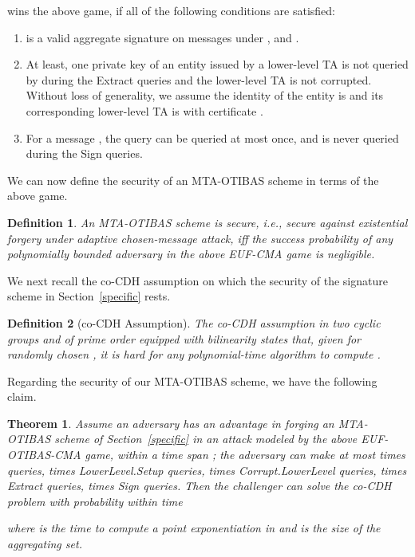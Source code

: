 \documentclass[10pt,journal,compsoc]{IEEEtran}
\newtheorem{definition}{Definition}
\newtheorem{theorem}{Theorem}
\begin{document}
\smallskip\noindent  wins the above game, if all of the
following conditions are satisfied:
\begin{enumerate}
  \item  is a valid aggregate signature on messages 
     under ,
 and
.

  \item At least, one
    private key of an entity issued by a lower-level TA is not queried by  during the {\sf Extract}
  queries and the lower-level TA is not corrupted. Without loss of generality,
  we assume the identity of the entity is
   and its corresponding lower-level TA is
   with certificate
  .

  \item For a message , the query 
   can be queried at most once,
  and  is never queried during the {\sf Sign} queries.
\end{enumerate}

We can now define the security of an MTA-OTIBAS scheme in terms of the
above game.

\begin{definition} An MTA-OTIBAS scheme is secure, i.e., secure against existential forgery
under adaptive chosen-message attack, iff the success probability of
any polynomially bounded adversary in the above EUF-CMA game is
negligible.
\end{definition}

We next recall the co-CDH assumption on which the security of the
signature scheme in Section~\ref{specific} rests.

\begin{definition}[co-CDH Assumption]
The co-CDH assumption in two cyclic groups  and
 of prime order  equipped with bilinearity states
that, given  for randomly chosen , it
is hard for any polynomial-time algorithm to compute .
\end{definition}

Regarding the security of our MTA-OTIBAS scheme, we have the following
claim.

\begin{theorem}
\label{teo1} Assume an adversary  has an advantage
 in forging an MTA-OTIBAS scheme
of Section~\ref{specific} in an attack modeled by the above
EUF-OTIBAS-CMA game, within a time span ; the adversary
can make at most  times  queries,
 times {\sf LowerLevel.Setup} queries,  times {\sf
Corrupt.LowerLevel} queries,  times {\sf Extract} queries,
 times {\sf Sign} queries. Then the challenger can solve the
co-CDH problem with probability  within time

where  is the time to compute a point exponentiation in
 and  is the size of the aggregating set.
\end{theorem}
\end{document}
